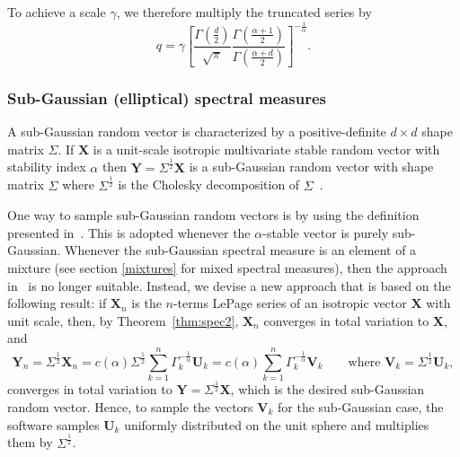 To achieve a scale $\gamma$, we therefore multiply the truncated series by
\begin{equation*}
    q=\gamma\left[\frac{\Gamma\left(\frac{d}{2}\right)}{\sqrt{\pi}}\frac{\Gamma\left(\frac{\alpha+1}{2}\right)}{\Gamma\left(\frac{\alpha+d}{2}\right)}\right]^{-\frac{1}{\alpha}}.
\end{equation*}

\subsubsection{Sub-Gaussian (elliptical) spectral measures}
\label{sub_guass_error}

A sub-Gaussian random vector is characterized by a  positive-definite $d\times d$ shape matrix $\Sigma$. If $\mathbf{X}$ is a unit-scale  isotropic multivariate stable random vector with stability index $\alpha$ then $\mathbf{Y}=\Sigma^{\frac{1}{2}}\mathbf{X}$ is a sub-Gaussian random vector with shape matrix $\Sigma$ where $\Sigma^{\frac{1}{2}}$ is the Cholesky decomposition of $\Sigma$~\cite{nolancirc2013}.

One way to sample sub-Gaussian random vectors is by using the definition presented in~\cite[Definition 2.5.1]{SamorodnitskyGennady2000Snrp}. This is adopted whenever the $\alpha$-stable vector is purely sub-Gaussian. Whenever the sub-Gaussian spectral measure is an element of a mixture (see section \ref{mixtures} for mixed spectral measures), then the approach in~\cite[Definition 2.5.1]{SamorodnitskyGennady2000Snrp} is no longer suitable.  Instead, we devise a new approach that is based on the following result: if $\mathbf{X}_n$ is the $n$-terms LePage series of an isotropic vector $\mathbf{X}$ with unit scale, then, by Theorem~\ref{thm:spec2}, $\mathbf{X}_n$ converges in total variation to $\mathbf{X}$, and \begin{equation}
\label{required_V}
\mathbf{Y}_n=\Sigma^{\frac{1}{2}}\mathbf{X}_n=c(\alpha)\Sigma^{\frac{1}{2}}\sum_{k=1}^n\Gamma_k^{-\frac{1}{\alpha}}\mathbf{U}_k=c(\alpha)\sum_{k=1}^n\Gamma_k^{-\frac{1}{\alpha}}\mathbf{V}_k \qquad \text{where } \mathbf{V}_k=\Sigma^{\frac{1}{2}}\mathbf{U}_k,
\end{equation}
converges in total variation to $\mathbf{Y}=\Sigma^{\frac{1}{2}}\mathbf{X}$, which is the desired sub-Gaussian random vector. Hence, to sample the vectors $\mathbf{V}_k$ for the sub-Gaussian case, the software samples  $\mathbf{U}_k$ uniformly distributed on the unit sphere and multiplies them by $\Sigma^{\frac{1}{2}}$.

